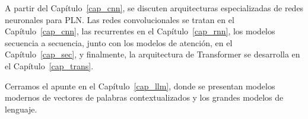 A partir del Capítulo~\ref{cap_cnn}, se discuten arquitecturas especializadas de redes neuronales para PLN. Las redes convolucionales se tratan en el Capítulo~\ref{cap_cnn}, las recurrentes en el Capítulo~\ref{cap_rnn}, los modelos secuencia a secuencia, junto con los modelos de atención, en el Capítulo~\ref{cap_sec}, y finalmente, la arquitectura de Transformer se desarrolla en el Capítulo~\ref{cap_trans}.

Cerramos el apunte en el Capítulo~\ref{cap_llm}, donde se presentan modelos modernos de vectores de palabras contextualizados y los grandes modelos de lenguaje.
